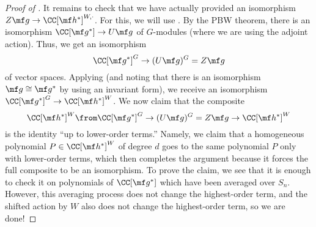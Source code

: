 \documentclass[../notes.tex]{subfiles}
\begin{document}
\begin{proof}[Proof of ]
	It remains to check that we have actually provided an isomorphism $Z\mf g\to\CC[\mf h^*]^{W,\cdot}$. For this, we will use . By the PBW theorem, there is an isomorphism $\CC[\mf g^*]\to U\mf g$ of $G$-modules (where we are using the adjoint action). Thus, we get an isomorphism
	\[\CC[\mf g^*]^G\to(U\mf g)^G=Z\mf g\]
	of vector spaces. Applying  (and noting that there is an isomorphism $\mf g\cong\mf g^*$ by using an invariant form), we receive an isomorphism $\CC[\mf g^*]^G\to\CC[\mf h^*]^W$. We now claim that the composite
	\[\CC[\mf h^*]^W\from\CC[\mf g^*]^G\to(U\mf g)^G=Z\mf g\to\CC[\mf h^*]^W\]
	is the identity ``up to lower-order terms.'' Namely, we claim that a homogeneous polynomial $P\in\CC[\mf h^*]^W$ of degree $d$ goes to the same polynomial $P$ only with lower-order terms, which then completes the argument because it forces the full composite to be an isomorphism. To prove the claim, we see that it is enough to check it on polynomials of $\CC[\mf g^*]$ which have been averaged over $S_n$. However, this averaging process does not change the highest-order term, and the shifted action by $W$ also does not change the highest-order term, so we are done!
\end{proof}

\end{document}
